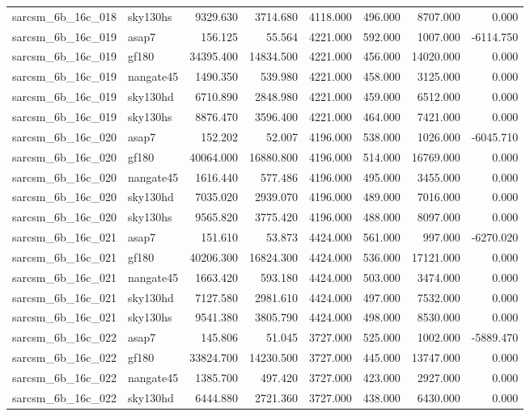 \begin{tabular}{llrrrrrr}
sarcsm\_6b\_16c\_018 & sky130hs & 9329.630 & 3714.680 & 4118.000 & 496.000 & 8707.000 & 0.000 \\
sarcsm\_6b\_16c\_019 & asap7 & 156.125 & 55.564 & 4221.000 & 592.000 & 1007.000 & -6114.750 \\
sarcsm\_6b\_16c\_019 & gf180 & 34395.400 & 14834.500 & 4221.000 & 456.000 & 14020.000 & 0.000 \\
sarcsm\_6b\_16c\_019 & nangate45 & 1490.350 & 539.980 & 4221.000 & 458.000 & 3125.000 & 0.000 \\
sarcsm\_6b\_16c\_019 & sky130hd & 6710.890 & 2848.980 & 4221.000 & 459.000 & 6512.000 & 0.000 \\
sarcsm\_6b\_16c\_019 & sky130hs & 8876.470 & 3596.400 & 4221.000 & 464.000 & 7421.000 & 0.000 \\
sarcsm\_6b\_16c\_020 & asap7 & 152.202 & 52.007 & 4196.000 & 538.000 & 1026.000 & -6045.710 \\
sarcsm\_6b\_16c\_020 & gf180 & 40064.000 & 16880.800 & 4196.000 & 514.000 & 16769.000 & 0.000 \\
sarcsm\_6b\_16c\_020 & nangate45 & 1616.440 & 577.486 & 4196.000 & 495.000 & 3455.000 & 0.000 \\
sarcsm\_6b\_16c\_020 & sky130hd & 7035.020 & 2939.070 & 4196.000 & 489.000 & 7016.000 & 0.000 \\
sarcsm\_6b\_16c\_020 & sky130hs & 9565.820 & 3775.420 & 4196.000 & 488.000 & 8097.000 & 0.000 \\
sarcsm\_6b\_16c\_021 & asap7 & 151.610 & 53.873 & 4424.000 & 561.000 & 997.000 & -6270.020 \\
sarcsm\_6b\_16c\_021 & gf180 & 40206.300 & 16824.300 & 4424.000 & 536.000 & 17121.000 & 0.000 \\
sarcsm\_6b\_16c\_021 & nangate45 & 1663.420 & 593.180 & 4424.000 & 503.000 & 3474.000 & 0.000 \\
sarcsm\_6b\_16c\_021 & sky130hd & 7127.580 & 2981.610 & 4424.000 & 497.000 & 7532.000 & 0.000 \\
sarcsm\_6b\_16c\_021 & sky130hs & 9541.380 & 3805.790 & 4424.000 & 498.000 & 8530.000 & 0.000 \\
sarcsm\_6b\_16c\_022 & asap7 & 145.806 & 51.045 & 3727.000 & 525.000 & 1002.000 & -5889.470 \\
sarcsm\_6b\_16c\_022 & gf180 & 33824.700 & 14230.500 & 3727.000 & 445.000 & 13747.000 & 0.000 \\
sarcsm\_6b\_16c\_022 & nangate45 & 1385.700 & 497.420 & 3727.000 & 423.000 & 2927.000 & 0.000 \\
sarcsm\_6b\_16c\_022 & sky130hd & 6444.880 & 2721.360 & 3727.000 & 438.000 & 6430.000 & 0.000 \\

\end{tabular}
